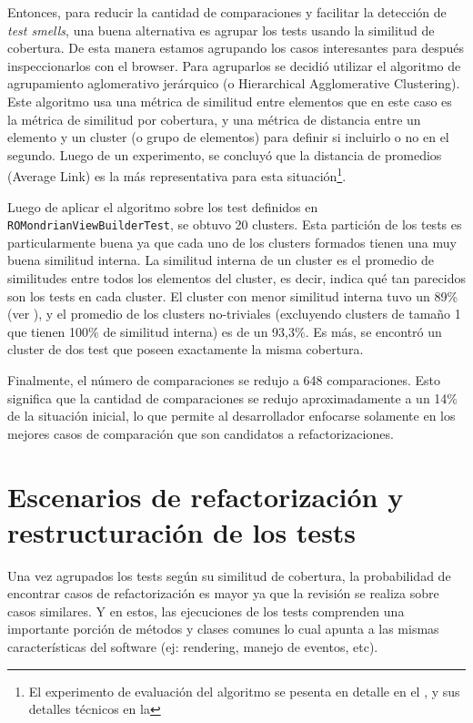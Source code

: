 \par Entonces, para reducir la cantidad de comparaciones y facilitar la detección de \emph{test smells}, una buena alternativa es agrupar los tests usando la similitud de cobertura. De esta manera estamos agrupando los casos interesantes para después inspeccionarlos con el browser. Para agruparlos se decidió utilizar el algoritmo de agrupamiento aglomerativo jerárquico (o Hierarchical Agglomerative Clustering). Este algoritmo usa una métrica de similitud entre elementos que en este caso es la métrica de similitud por cobertura, y una métrica de distancia entre un elemento y un cluster (o grupo de elementos) para definir si incluirlo o no en el segundo. Luego de un experimento, se concluyó que la distancia de promedios (Average Link) es la más representativa para esta situación\footnote{El experimento de evaluación del algoritmo se pesenta en detalle en el , y sus detalles técnicos en la  }.

\par Luego de aplicar el algoritmo sobre los test definidos en {\tt ROMondrianViewBuilderTest}, se obtuvo 20 clusters. Esta partición de los tests es particularmente buena ya que cada uno de los clusters formados tienen una muy buena similitud interna. La similitud interna de un cluster es el promedio de similitudes entre todos los elementos del cluster, es decir, indica qué tan parecidos son los tests en cada cluster. El cluster con menor similitud interna tuvo un 89\% (ver ), y el promedio de los clusters no-triviales (\ie excluyendo clusters de tamaño 1 que tienen 100\% de similitud interna) es de un 93,3\%. Es más, se encontró un cluster de dos test que poseen exactamente la misma cobertura. 

\par Finalmente, el número de comparaciones se redujo a 648 comparaciones. Esto significa que la cantidad de comparaciones se redujo aproximadamente a un 14\% de la situación inicial, lo que permite al desarrollador enfocarse solamente en los mejores casos de comparación que son candidatos a refactorizaciones.

\section{Escenarios de refactorización y restructuración de los tests}

\par Una vez agrupados los tests según su similitud de cobertura, la probabilidad de encontrar casos de refactorización es mayor ya que la revisión se realiza sobre casos similares. Y en estos, las ejecuciones de los tests comprenden una importante porción de métodos y clases comunes lo cual apunta a las mismas características del software (ej: rendering, manejo de eventos, etc). 

